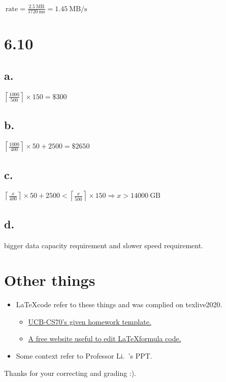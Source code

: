 \documentclass[11pt]{article}  %
\begin{document}
$ ~\text{rate} = \frac{2.5~\text{MB}}{1720~\text{ms}} = 1.45 ~\text{MB/s}$


\section*{6.10 }

\subsection*{a. }

$\left \lceil \frac{1000}{500} \right \rceil\times 150 = \$300 $

\subsection*{b. }

$\left \lceil \frac{1000}{400} \right \rceil\times 50  + 2500 = \$2650 $

\subsection*{c. }

$\left \lceil \frac{x}{400} \right \rceil\times 50  + 2500 < \left \lceil \frac{x}{500} \right \rceil\times 150  
\Longrightarrow x > 14000~\text{GB}$

\subsection*{d. }

bigger data capacity requirement and slower speed requirement.

\section*{Other things}

\begin{itemize}
    \item \LaTeX \space code refer to these things and was complied on texlive2020. 
    \begin{itemize}
        \item  \href{https://www.eecs70.org/assets/misc/homework_template.tex}{UCB-CS70's given homework template.} 
        \item  \href{https://www.latexlive.com}{A free website useful to edit \LaTeX \space formula code.}
    \end{itemize}
    \item Some context refer to Professor Li.~'s PPT.
\end{itemize}

    Thanks for your correcting and grading :).
\end{document}
